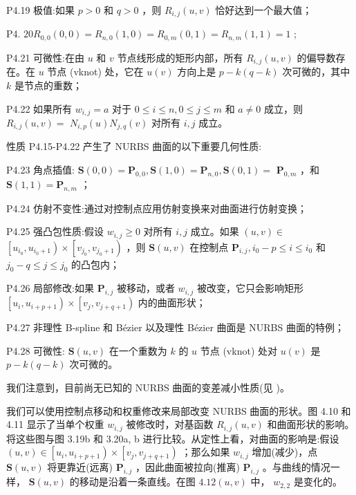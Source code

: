 \documentclass[../main.tex]{subfiles}
\begin{document}
P4.19 极值:如果 \(p > 0\) 和 \(q > 0\) ，则 \({R}_{i,j}\left( {u,v}\right)\) 恰好达到一个最大值；





P4. \({20}{R}_{0,0}\left( {0,0}\right)  = {R}_{n,0}\left( {1,0}\right)  = {R}_{0,m}\left( {0,1}\right)  = {R}_{n,m}\left( {1,1}\right)  = 1\) ;

P4.21 可微性:在由 \(u\) 和 \(v\) 节点线形成的矩形内部，所有 \({R}_{i,j}\left( {u,v}\right)\) 的偏导数存在。在 \(u\) 节点 (vknot) 处，它在 \(u\left( v\right)\) 方向上是 \(p - k\left( {q - k}\right)\) 次可微的，其中 \(k\) 是节点的重数；

P4.22 如果所有 \({w}_{i,j} = a\) 对于 \(0 \leq  i \leq  n,0 \leq  j \leq  m\) 和 \(a \neq  0\) 成立，则 \({R}_{i,j}\left( {u,v}\right)  =\)  \({N}_{i,p}\left( u\right) {N}_{j,q}\left( v\right)\) 对所有 \(i,j\) 成立。

性质 P4.15-P4.22 产生了 NURBS 曲面的以下重要几何性质:

P4.23 角点插值: \(\mathbf{S}\left( {0,0}\right)  = {\mathbf{P}}_{0,0},\mathbf{S}\left( {1,0}\right)  = {\mathbf{P}}_{n,0},\mathbf{S}\left( {0,1}\right)  =\)  \({\mathbf{P}}_{0,m}\) ，和 \(\mathbf{S}\left( {1,1}\right)  = {\mathbf{P}}_{n,m}\) ；

P4.24 仿射不变性:通过对控制点应用仿射变换来对曲面进行仿射变换；

P4.25 强凸包性质:假设 \({w}_{i,j} \geq  0\) 对所有 \(i,j\) 成立。如果 \(\left( {u,v}\right)  \in\)  \(\left\lbrack  {{u}_{{i}_{0}},{u}_{{i}_{0} + 1}}\right)  \times  \left\lbrack  {{v}_{{j}_{0}},{v}_{{j}_{0} + 1}}\right)\) ，则 \(\mathbf{S}\left( {u,v}\right)\) 在控制点 \({\mathbf{P}}_{i,j},{i}_{0} - p \leq  i \leq  {i}_{0}\) 和 \({j}_{0} - q \leq  j \leq  {j}_{0}\) 的凸包内；

P4.26 局部修改:如果 \({\mathbf{P}}_{i,j}\) 被移动，或者 \({w}_{i,j}\) 被改变，它只会影响矩形 \(\left\lbrack  {{u}_{i},{u}_{i + p + 1}}\right)  \times  \left\lbrack  {{v}_{j},{v}_{j + q + 1}}\right)\) 内的曲面形状；

P4.27 非理性 B-spline 和 Bézier 以及理性 Bézier 曲面是 NURBS 曲面的特例；

P4.28 可微性: \(\mathbf{S}\left( {u,v}\right)\) 在一个重数为 \(k\) 的 \(u\) 节点 (vknot) 处对 \(u\left( v\right)\) 是 \(p - k\left( {q - k}\right)\) 次可微的。

我们注意到，目前尚无已知的 NURBS 曲面的变差减小性质(见 \cite{Prau92})。

我们可以使用控制点移动和权重修改来局部改变 NURBS 曲面的形状。图 4.10 和 4.11 显示了当单个权重 \({w}_{i,j}\) 被修改时，对基函数 \({R}_{i,j}\left( {u,v}\right)\) 和曲面形状的影响。将这些图与图 3.19b 和 3.20a, b 进行比较。从定性上看，对曲面的影响是:假设 \(\left( {u,v}\right)  \in  \left\lbrack  {{u}_{i},{u}_{i + p + 1}}\right)  \times  \left\lbrack  {{v}_{j},{v}_{j + q + 1}}\right)\) ；那么如果 \({w}_{i,j}\) 增加(减少)，点 \(\mathbf{S}\left( {u,v}\right)\) 将更靠近(远离) \({\mathbf{P}}_{i,j}\) ，因此曲面被拉向(推离) \({\mathbf{P}}_{i,j}\) 。与曲线的情况一样， \(\mathbf{S}\left( {u,v}\right)\) 的移动是沿着一条直线。在图 \({4.12}\left( {u,v}\right)\) 中， \({w}_{2,2}\) 是变化的。
\end{document}
